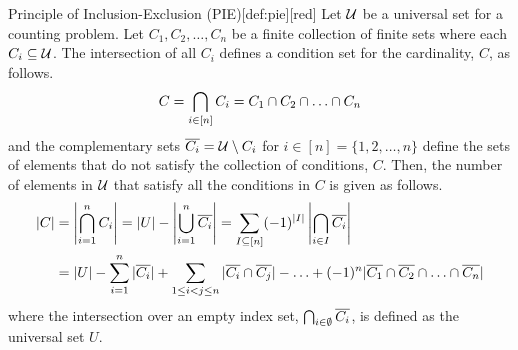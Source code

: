 \documentclass[10pt]{article}
\theoremstyle{definition}
\theoremstyle{plain}
\numberwithin{equation}{section}
\begin{document}
\newpage


\begin{define}{Principle of Inclusion-Exclusion (PIE)}[def:pie][red]
  Let $\mathcal{U}$ be a universal set for a counting problem. 
  Let $C_1, C_2, \ldots, C_n$ be a finite collection of finite sets where each $C_i \subseteq \mathcal{U}$.
  The intersection of all $C_i$ defines a condition set for the cardinality, $C$, as follows.
  $$
  C=\bigcap_{i \in [n]} C_i=C_1 \sAND C_2 \sAND \ldots \sAND C_n
  $$
  and the complementary sets $\sNOT{C_i}=\setUNIV \sMINUS C_i$ for $i \in [n] = \{1, 2, \ldots, n\}$ define the sets 
  of elements that do not satisfy the collection of conditions, $C$. Then, 
  the number of elements in $\mathcal{U}$ that satisfy all the conditions in $C$ is given as follows.
  \begin{align*}
    |C| 
      &= \left| \bigcap_{i=1}^{n} C_i \right| 
      = |U| - \left| \bigcup_{i=1}^{n} \sNOT{C_i} \right| 
      = \sum_{I \subseteq [n]} (-1)^{|I|} \left| \bigcap_{i \in I} \sNOT{C_i} \right| \\
      &= |U| - \sum_{i=1}^{n} |\sNOT{C_i}| 
         + \sum_{1 \leq i < j \leq n} |\sNOT{C_i} \sAND \sNOT{C_j}| 
         - \ldots 
         + (-1)^n |\sNOT{C_1} \sAND \sNOT{C_2} \sAND \ldots \sAND \sNOT{C_n}|
  \end{align*}
  where the intersection over an empty index set, $\bigcap_{i \in \emptyset} \sNOT{C_i}$, is defined as the universal set $U$.
\end{define}
\end{document}
